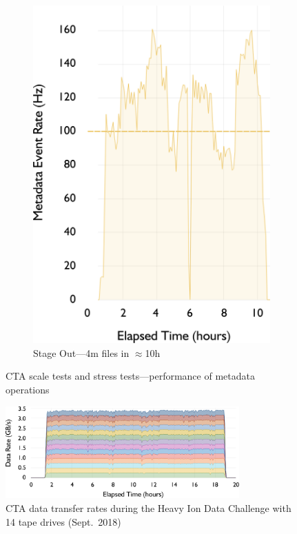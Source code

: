 \documentclass{webofc}
\begin{document}
\begin{figure}[t]
{\begin{subfigure}[b]{0.312\textwidth}
      \includegraphics[width=\textwidth]{images/retrieves_4M}
      \caption{Stage Out---4m files in $\approx$10h}
      \label{fig:scale_stress_tests_retrieve}
   \end{subfigure}
   }
   \caption{CTA scale tests and stress tests---performance of metadata operations}
   \label{fig:Deployment}
\end{figure}
\begin{figure}[t]
   \centering
   \includegraphics[width=0.8\textwidth]{images/archives_35GB}
   \caption{CTA data transfer rates during the Heavy Ion Data Challenge with 14 tape drives (Sept.~2018)}
   \label{fig:HI_data_challenge}
\end{figure}
\end{document}
